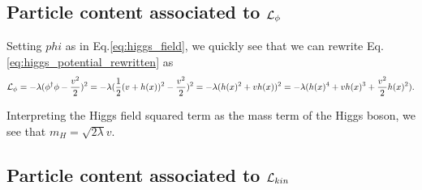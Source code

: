 \subsection{Particle content associated to $\mathcal{L}_\phi$}

Setting $phi$ as in Eq.\ref{eq:higgs_field}, we quickly see that we can rewrite Eq.\ref{eq:higgs_potential_rewritten} as
\begin{equation}
\mathcal{L}_\phi = - \lambda (\phi^\dagger \phi - \frac{v^2}{2})^2  = - \lambda ( \frac{1}{2} (v + h(x))^2 - \frac{v^2}{2})^2 = - \lambda ( h(x)^2 + vh(x))^2 = -\lambda ( h(x)^4 + v h(x)^3 + \frac{v^2}{2} h(x)^2 ).
\end{equation}

Interpreting the Higgs field squared term as the mass term of the Higgs boson, we see that $m_H = \sqrt{2 \lambda} v$.

\subsection{Particle content associated to $\mathcal{L}_{kin}$}


